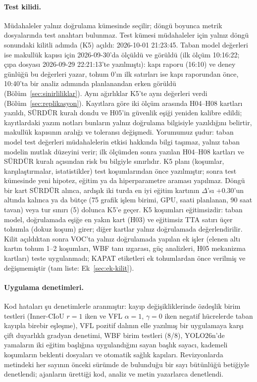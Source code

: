 \documentclass[pdflatex,iicol,sn-mathphys-num]{sn-jnl}
\begin{document}
\paragraph{Test kilidi.}
Müdahaleler yalnız doğrulama kümesinde seçilir; döngü boyunca metrik dosyalarında test anahtarı bulunmaz. Test kümesi müdahaleler için yalnız döngü sonundaki kilitli adımda (K5) açıldı: 2026-10-01 21:23:45. Taban model değerleri ise makullük kapısı için 2026-09-30'da ölçüldü ve görüldü (ilk ölçüm 10:16:22; çıpa dosyası 2026-09-29 22:21:13'te yazılmıştı): kapı raporu (16:10) ve deney günlüğü bu değerleri yazar, tohum 0'ın ilk satırları ise kapı raporundan önce, 10:40'ta bir analiz adımında planlanandan erken görüldü (Bölüm~\ref{sec:sinirliliklar}). Aynı ağırlıklar K5'te aynı değerleri verdi (Bölüm~\ref{sec:replikasyon}). Kayıtlara göre iki ölçüm arasında H04--H08 kartları yazıldı, SÜRDÜR kuralı dondu ve H05'in güvenlik eşiği yeniden kalibre edildi; kayıtlardaki yazım notları bunların yalnız doğrulama bilgisiyle yazıldığını belirtir, makullük kapısının aralığı ve toleransı değişmedi. Yorumumuz şudur: taban model test değerleri müdahalelerin etkisi hakkında bilgi taşımaz, yalnız taban modelin mutlak düzeyini verir; ilk ölçümden sonra yazılan H04--H08 kartları ve SÜRDÜR kuralı açısından risk bu bilgiyle sınırlıdır. K5 planı (koşumlar, karşılaştırmalar, istatistikler) test koşumlarından önce yazılmıştır; sonra test kümesinde yeni hipotez, eğitim ya da hiperparametre araması yapılmaz. Döngü bir kart SÜRDÜR alınca, ardışık iki turda en iyi eğitim kartının $\Delta$'sı $+0.30$'un altında kalınca ya da bütçe (75 grafik işlem birimi, GPU, saati planlanan, 90 saat tavan) veya tur sınırı (5) dolunca K5'e geçer. K5 koşumları eğitimsizdir: taban model, doğrulamada eşiğe en yakın kart (H03) ve eğitimsiz TTA satırı üçer tohumla (dokuz koşum) girer; diğer kartlar yalnız doğrulamada değerlendirilir. Kilit açıldıktan sonra VOC'ta yalnız doğrulamada yapılan ek işler (elenen altı kartın tohum 1--2 koşumları, WBF tanı ızgarası, güç analizleri, H05 mekanizma kartları) teste uygulanmadı; KAPAT etiketleri ek tohumlardan önce verilmiş ve değişmemiştir (tam liste: Ek~\ref{sec:ek-kilit}).

\paragraph{Uygulama denetimleri.}
Kod hataları şu denetimlerle aranmıştır: kayıp değişikliklerinde özdeşlik birim testleri (Inner-CIoU $r=1$ iken ve VFL $\alpha=1$, $\gamma=0$ iken negatif hücrelerde taban kayıpla birebir eşleşme), VFL pozitif dalının elle yazılmış bir uygulamaya karşı çift duyarlıklı gradyan denetimi, WBF birim testleri (8/8), YOLO26n'de yamaların iki eğitim başlığına uygulandığını sayan başlık sayacı, kademeli koşumların beklenti dosyaları ve otomatik sağlık kapıları. Revizyonlarda metindeki her sayının önceki sürümde de bulunduğu bir sayı bütünlüğü betiğiyle denetlendi; ajanların ürettiği kod, analiz ve metin yazarlarca denetlendi.
\end{document}
